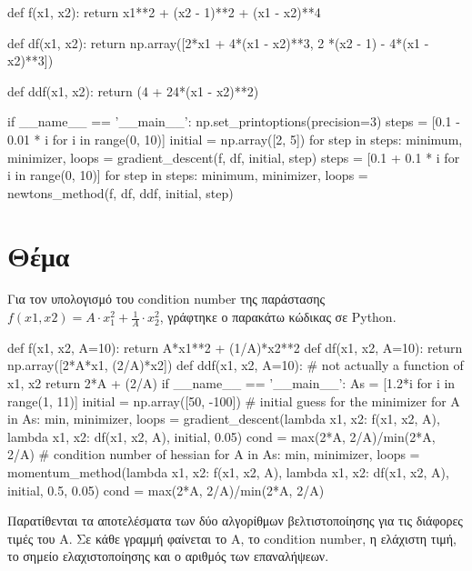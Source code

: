 \documentclass{article}
\newcommand{\eng}[1]{\foreignlanguage{english}{#1}} %
\begin{document}
\begin{python}
def f(x1, x2):
    return x1**2 + (x2 - 1)**2 + (x1 - x2)**4

def df(x1, x2):
    return np.array([2*x1 + 4*(x1 - x2)**3, 2 *(x2 - 1) - 4*(x1 - x2)**3])

def ddf(x1, x2):
    return (4 + 24*(x1 - x2)**2)

if __name__ == '__main__':
    np.set_printoptions(precision=3)
    steps = [0.1 - 0.01 * i for i in range(0, 10)]
    initial = np.array([2, 5])
    for step in steps:
        minimum, minimizer, loops = gradient_descent(f, df, initial, step)
    steps = [0.1 + 0.1 * i for i in range(0, 10)]
    for step in steps:
        minimum, minimizer, loops = newtons_method(f, df, ddf, initial, step)
\end{python}

\clearpage
\section{Θέμα}

Για τον υπολογισμό του \eng{condition number} της παράστασης $f(x1, x2) = A
\cdot x_1^2 + \frac{1}{A} \cdot x_2^2$, γράφτηκε ο παρακάτω κώδικας σε
\eng{Python}.

\begin{python}
def f(x1, x2, A=10):
    return A*x1**2 + (1/A)*x2**2
def df(x1, x2, A=10):
    return np.array([2*A*x1, (2/A)*x2])
def ddf(x1, x2, A=10): # not actually a function of x1, x2
    return 2*A + (2/A)
if __name__ == '__main__':
    As = [1.2*i for i in range(1, 11)]
    initial = np.array([50, -100]) # initial guess for the minimizer
    for A in As:
        min, minimizer, loops = gradient_descent(lambda x1, x2: f(x1, x2, A),
                                                 lambda x1, x2: df(x1, x2, A),
                                                 initial, 0.05)
        cond = max(2*A, 2/A)/min(2*A, 2/A) # condition number of hessian
    for A in As:
        min, minimizer, loops = momentum_method(lambda x1, x2: f(x1, x2, A),
                                                lambda x1, x2: df(x1, x2, A),
                                                initial, 0.5, 0.05)
        cond = max(2*A, 2/A)/min(2*A, 2/A)
\end{python}

Παρατίθενται τα αποτελέσματα των δύο αλγορίθμων βελτιστοποίησης για τις
διάφορες τιμές του Α. Σε κάθε γραμμή φαίνεται το Α, το \eng{condition number},
η ελάχιστη τιμή, το σημείο ελαχιστοποίησης και ο αριθμός των επαναλήψεων.
\end{document}

